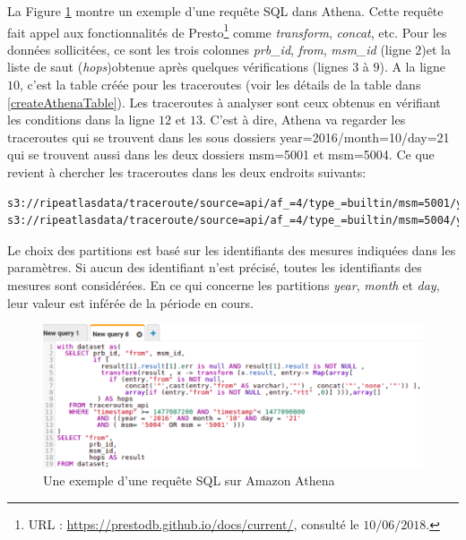La Figure \ref{fig:sqlrequestathena} montre  un exemple d'une  requête SQL dans Athena.  Cette requête fait appel aux fonctionnalités  de Presto\footnote{URL : \url{https://prestodb.github.io/docs/current/}, consulté le $10/06/2018$.} comme  \textit{transform}, \textit{concat}, etc. 
Pour les données sollicitées, ce sont les trois colonnes \textit{prb\_id}, \textit{from}, \textit{msm\_id} (ligne $2$)et la liste de saut (\textit{hops})obtenue après quelques vérifications (lignes $3$ à $9$). A la ligne $10$, c'est la table créée pour les traceroutes (voir les détails de la table dans \ref{createAthenaTable}). Les traceroutes à analyser sont ceux obtenus en vérifiant les conditions dans la ligne  $12$ et $13$. C'est à dire, Athena va regarder les traceroutes qui se trouvent dans les sous dossiers year=2016/month=10/day=21 qui se trouvent aussi dans les deux dossiers msm=5001 et msm=5004. Ce que revient à chercher les traceroutes dans les deux endroits suivants:

\begin{lstlisting}[basicstyle= \footnotesize]
s3://ripeatlasdata/traceroute/source=api/af_=4/type_=builtin/msm=5001/year=2016/month=10/day=21
s3://ripeatlasdata/traceroute/source=api/af_=4/type_=builtin/msm=5004/year=2016/month=10/day=21
\end{lstlisting}

Le choix des partitions est basé sur les identifiants des mesures indiquées dans les paramètres. Si aucun des identifiant n'est précisé, toutes les identifiants des mesures sont considérées. En ce qui concerne les partitions \textit{year}, \textit{month} et \textit{day}, leur valeur est inférée de la période en cours.

\begin{figure}[h]
	\centering
	\includegraphics[width=1\linewidth]{illustrations/sqlRequestAthena2.png}
	\caption{Une exemple d'une requête SQL sur Amazon Athena}
	\label{fig:sqlrequestathena}
\end{figure}




